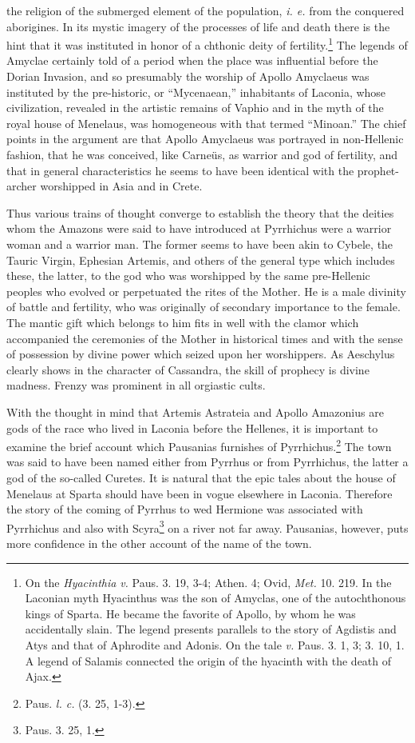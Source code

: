 \documentclass[a4paper, 12pt, oneside]{article}
\begin{document}
the religion of the submerged element of the population, \emph{i. e.} from the conquered aborigines. In its mystic imagery of the processes of life and death there is the hint that it was instituted in honor of a chthonic deity of fertility.\footnote{On the \emph{Hyacinthia} \emph{v.} Paus. 3. 19, 3-4; Athen. 4; Ovid, \emph{Met.} 10. 219. In the Laconian myth Hyacinthus was the son of Amyclas, one of the autochthonous kings of Sparta. He became the favorite of Apollo, by whom he was accidentally slain. The legend presents parallels to the story of Agdistis and Atys and that of Aphrodite and Adonis. On the tale \emph{v.} Paus. 3. 1, 3; 3. 10, 1. A legend of Salamis connected the origin of the hyacinth with the death of Ajax.} The legends of Amyclae certainly told of a period when the place was influential before the Dorian Invasion, and so presumably the worship of Apollo Amyclaeus was instituted by the pre-historic, or ``Mycenaean,'' inhabitants of Laconia, whose civilization, revealed in the artistic remains of Vaphio and in the myth of the royal house of Menelaus, was homogeneous with that termed ``Minoan.'' The chief points in the argument are that Apollo Amyclaeus was portrayed in non-Hellenic fashion, that he was conceived, like Carneüs, as warrior and god of fertility, and that in general characteristics he seems to have been identical with the prophet-archer worshipped in Asia and in Crete.

Thus various trains of thought converge to establish the theory that the deities whom the Amazons were said to have introduced at Pyrrhichus were a warrior woman and a warrior man. The former seems to have been akin to Cybele, the Tauric Virgin, Ephesian Artemis, and others of the general type which includes these, the latter, to the god who was worshipped by the same pre-Hellenic peoples who evolved or perpetuated the rites of the Mother. He is a male divinity of battle and fertility, who was originally of secondary importance to the female. The mantic gift which belongs to him fits in well with the clamor which accompanied the ceremonies of the Mother in historical times and with the sense of possession by divine power which seized upon her worshippers. As Aeschylus clearly shows in the character of Cassandra, the skill of prophecy is divine madness. Frenzy was prominent in all orgiastic cults.

With the thought in mind that Artemis Astrateia and Apollo Amazonius are gods of the race who lived in Laconia before the Hellenes, it is important to examine the brief account which Pausanias furnishes of Pyrrhichus.\footnote{Paus. \emph{l. c.} (3. 25, 1-3).} The town was said to have been named either from Pyrrhus or from Pyrrhichus, the latter a god of the so-called Curetes. It is natural that the epic tales about the house of Menelaus at Sparta should have been in vogue elsewhere in Laconia. Therefore the story of the coming of Pyrrhus to wed Hermione was associated with Pyrrhichus and also with Scyra\footnote{Paus. 3. 25, 1.} on a river not far away. Pausanias, however, puts more confidence in the other account of the name of the town.
\end{document}
